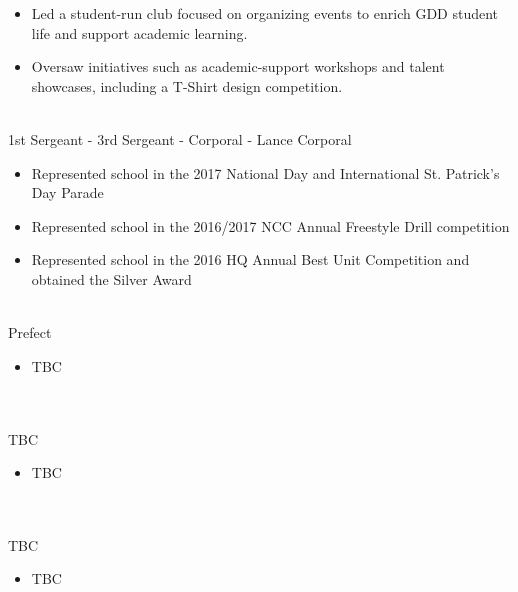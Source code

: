 \documentclass[a4paper,10pt]{article}
\begin{document}
\begin{paracol}{2}
\begin{rightcolumn}
\begin{itemize}[left=0pt, labelsep=0.5em, itemsep=0pt, topsep=0pt, parsep=0pt, partopsep=0pt]
        \item \lato Led a student-run club focused on organizing events to enrich GDD student life and support academic learning.      
        \item \lato Oversaw initiatives such as academic-support workshops and talent showcases, including a T-Shirt design competition.
      \end{itemize}
      \vspace{0.35cm}
      \normalsize{} \hfill\small{}\\
      \latobold 1st Sergeant - 3rd Sergeant - Corporal - Lance Corporal
      \begin{itemize}[left=0pt, labelsep=0.5em, itemsep=0pt, topsep=0pt, parsep=0pt, partopsep=0pt]
        \item \lato Represented school in the 2017 National Day and International St. Patrick's Day Parade
        \item \lato Represented school in the 2016/2017 NCC Annual Freestyle Drill competition
        \item \lato Represented school in the 2016 HQ Annual Best Unit Competition and obtained the Silver Award
      \end{itemize}
      \vspace{0.35cm}
      \normalsize{} \hfill\small{}\\
      \latobold Prefect
      \begin{itemize}[left=0pt, labelsep=0.5em, itemsep=0pt, topsep=0pt, parsep=0pt, partopsep=0pt]
        \item \lato TBC      
      \end{itemize}
    \vspace{0.35cm}
    \Large\noindent{}
    \vspace{0.15cm}\\
    \normalsize{} \hfill\small{}\\
    \latobold TBC
    \begin{itemize}[left=0pt, labelsep=0.5em, itemsep=0pt, topsep=0pt, parsep=0pt, partopsep=0pt]
      \item \lato TBC      
    \end{itemize}
    \vspace{0.35cm}
    \Large\noindent{}
    \vspace{0.15cm}\\
    \normalsize{} \hfill\small{}\\
    \latobold TBC
    \begin{itemize}[left=0pt, labelsep=0.5em, itemsep=0pt, topsep=0pt, parsep=0pt, partopsep=0pt]
      \item \lato TBC      
    \end{itemize}
    \end{rightcolumn}  
  \end{paracol}
\end{document}
